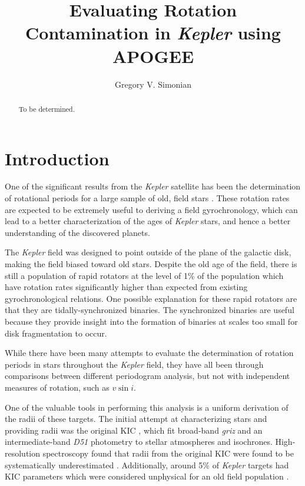\documentclass[manuscript]{aastex6}
\newcommand{\vsini}{\ensuremath{v \sin i}}
\newcommand{\Kepler}{\mbox{\textit{Kepler}}}
\begin{document}
\title{Evaluating Rotation Contamination in \Kepler{} using APOGEE}
\author{Gregory V. Simonian}

\begin{abstract}
To be determined.
\end{abstract}

\section{Introduction}

One of the significant results from the \Kepler{} satellite has been the
determination of rotational periods for a large sample of old, field stars
\citep{Basri11,Affer12,Nielsen13,Reinhold13,McQuillan14,Garcia14}.
These rotation rates are expected to be extremely useful to deriving a field
gyrochronology, which can lead to a better characterization of the ages of
\Kepler{} stars, and hence a better understanding of the discovered planets.

The \Kepler{} field was designed to point outside of the plane of the galactic
disk, making the field biased toward old stars. Despite the old age of the
field, there is still a population of rapid rotators at the level of 1\% of the
population which have rotation rates significantly higher than expected from
existing gyrochronological relations. One possible explanation for these rapid
rotators are that they are tidally-synchronized binaries. The synchronized
binaries are useful because they provide insight into the formation of binaries
at scales too small for disk fragmentation to occur. 

While there have been many attempts to evaluate the determination of rotation
periods in stars throughout the \Kepler{} field, they have all been through
comparisons between different periodogram analysis, but not with independent 
measures of rotation, such as \vsini.

One of the valuable tools in performing this analysis is a uniform derivation
of the radii of these targets. The initial attempt at characterizing stars and
providing radii was the original KIC \citep{Brown11}, which fit broad-band
\textit{griz} and an intermediate-band \textit{D51} photometry to
\citet{Castelli04} stellar atmospheres and \citet{Girardi00} isochrones.
High-resolution spectroscopy found that radii from the original KIC were found 
to be systematically underestimated \citep{Everett13}. Additionally, around 5\%
of \Kepler{} targets had KIC parameters which were considered unphysical for an 
old field population \citep{Batalha13}. 
\end{document}
